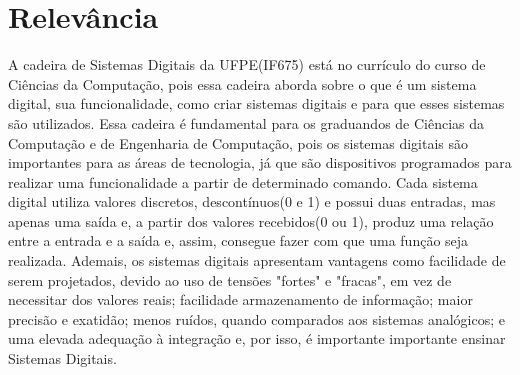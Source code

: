 \documentclass[a4paper]{article}
\begin{document}
\section*{Relevância}
A cadeira de Sistemas Digitais da UFPE(IF675) está no currículo do curso de Ciências da Computação, pois essa cadeira aborda sobre o que é um sistema digital, sua funcionalidade, como criar sistemas digitais e para que esses sistemas são utilizados. Essa cadeira é fundamental para os graduandos de Ciências da Computação e de Engenharia de Computação, pois os sistemas digitais são importantes para as áreas de tecnologia, já que são dispositivos programados para realizar uma funcionalidade a partir de determinado comando. Cada sistema digital utiliza valores discretos, descontínuos(0 e 1) e possui duas entradas, mas apenas uma saída e, a partir dos valores recebidos(0 ou 1), produz uma relação entre a entrada e a saída e, assim, consegue fazer com que uma função seja realizada. Ademais, os sistemas digitais apresentam vantagens como facilidade de serem projetados, devido ao uso de tensões "fortes" e "fracas", em vez de necessitar dos valores reais; facilidade armazenamento de informação; maior precisão e exatidão; menos ruídos, quando comparados aos sistemas analógicos; e uma elevada adequação à integração e, por isso, é importante importante ensinar Sistemas Digitais.\\
\end{document}
